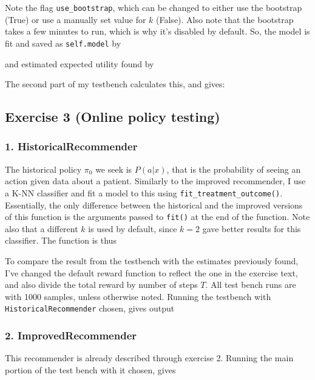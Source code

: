 \documentclass[a4paper]{article}
\begin{document}
Note the flag \texttt{use\_bootstrap}, which can be changed to either use the bootstrap (True) or use a
manually set value for $k$ (False). Also note that the bootstrap takes a few minutes to run, which is
why it's disabled by default.  So, the model is fit and saved as \texttt{self.model} by



and estimated expected utility found by



The second part of my testbench calculates this, and gives:


\subsection*{Exercise 3 (Online policy testing)}
\subsubsection*{1. HistoricalRecommender}

The historical policy $\pi_0$ we seek is $P(a|x)$, that is the probability of seeing an
action given data about a patient. Similarly to the improved recommender, I use a K-NN classifier and
fit a model to this using \texttt{fit\_treatment\_outcome()}.  Essentially, the only difference between
the historical and the improved versions of this function is the arguments passed to \texttt{fit()} at
the end of the function. Note also that a different $k$ is used by default, since $k = 2$ gave better
results for this classifier. The function is thus


\clearpage
To compare the result from the testbench with the estimates previously found,
I've changed the default reward function to reflect the one in the exercise text,
and also divide the total reward by number of steps $T$. 
All test bench runs are with 1000 samples, unless otherwise noted.
Running the testbench with \texttt{HistoricalRecommender} chosen, gives output



\subsubsection*{2. ImprovedRecommender}
This recommender is already described through exercise 2. Running the main portion of the
test bench with it chosen, gives
\end{document}
